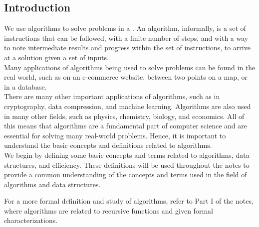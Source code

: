 \documentclass[openany]{book}
\begin{document}
\subsection{Introduction}
We use algorithms to solve problems in a . An algorithm, informally, is a set of instructions that can be followed, with a finite number of steps, and with a way to note intermediate results and progress within the set of instructions, to arrive at a solution given a set of inputs. \\
Many applications of algorithms being used to solve problems can be found in the real world, such as  on an e-commerce website,  between two points on a map, or  in a database. \\
There are many other important applications of algorithms, such as in cryptography, data compression, and machine learning. Algorithms are also used in many other fields, such as physics, chemistry, biology, and economics. All of this means that algorithms are a fundamental part of computer science and are essential for solving many real-world problems. Hence, it is important to understand the basic concepts and definitions related to algorithms. \\
We begin by defining some basic concepts and terms related to algorithms, data structures, and efficiency. These definitions will be used throughout the notes to provide a common understanding of the concepts and terms used in the field of algorithms and data structures. 
\begin{mynote}
    For a more formal definition and study of algorithms, refer to Part I of the notes, where algorithms are related to recursive functions and given formal characterizations. 
\end{mynote}
\end{document}
